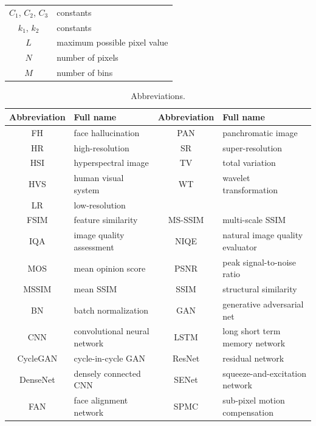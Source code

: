 {\begin{table}[h]
\begin{tabular}{|c|l|}
        $C_1$, $C_2$, $C_3$  & constants \\
        $k_1$, $k_2$         & constants \\
        \hline
        $L$  & maximum possible pixel value \\
        $N$  & number of pixels \\
        $M$  & number of bins \\
        \hline
    \end{tabular}
\end{table}
\begin{table}[h]
    \renewcommand{\arraystretch}{1.3}
    \caption{Abbreviations.}
    \label{tab_abbreviations}
    \centering
    \begin{tabular}{|clcl|}
        \hline
        Abbreviation & Full name   & Abbreviation & Full name \\
        \hline
        FH & face hallucination    & PAN & panchromatic image \\
        HR & high-resolution       & SR & super-resolution \\
        HSI & hyperspectral image  & TV & total variation \\
        HVS & human visual system  & WT & wavelet transformation \\
        LR & low-resolution        & & \\
        \hline
        FSIM  & feature similarity                     & MS-SSIM  & multi-scale SSIM \\
        IQA & image quality assessment                                        & NIQE  & natural image quality evaluator \\
        MOS & mean opinion score                                              & PSNR & peak signal-to-noise ratio \\
        MSSIM  & mean SSIM                             & SSIM  & structural similarity \\
        \hline
        BN  & batch normalization           & GAN  & generative adversarial net \\
        CNN & convolutional neural network                            & LSTM & long short term memory network \\
        CycleGAN  & cycle-in-cycle GAN      & ResNet  & residual network \\
        DenseNet  & densely connected CNN  & SENet  & squeeze-and-excitation network \\
        FAN & face alignment network                                  & SPMC  & sub-pixel motion compensation \\

\end{tabular}
\end{table}}

